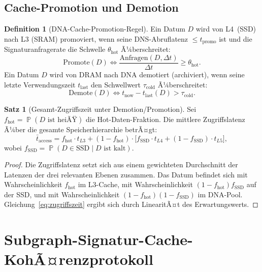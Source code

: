 ﻿\documentclass[a4paper,12pt]{article}
\theoremstyle{definition}
\newtheorem{definition}{Definition}[section]
\newtheorem{satz}{Satz}[section]
\DeclareMathOperator{\Prob}{\mathbb{P}}
\begin{document}
\subsection{Cache-Promotion und Demotion}

\begin{definition}[DNA-Cache-Promotion-Regel]
  \label{def:promotion}
  Ein Datum $D$ wird von L4~(SSD) nach L3 (SRAM) promoviert, wenn
  seine DNS-Abruflatenz $\le t_{\mathrm{promo}}$ ist und die
  Signaturanfragerate die Schwelle $\theta_{\mathrm{hot}}$ Ã¼berschreitet:
  \[
    \mathrm{Promote}(D) \iff
    \frac{\mathrm{Anfragen}(D, \Delta t)}{\Delta t} \ge \theta_{\mathrm{hot}}.
  \]
  Ein Datum $D$ wird von DRAM nach DNA demotiert (archiviert), wenn
  seine letzte Verwendungszeit $t_{\mathrm{last}}$ den Schwellwert
  $\tau_{\mathrm{cold}}$ Ã¼berschreitet:
  \[
    \mathrm{Demote}(D) \iff t_{\mathrm{now}} - t_{\mathrm{last}}(D) > \tau_{\mathrm{cold}}.
  \]
\end{definition}

\begin{satz}[Gesamt-Zugriffszeit unter Demotion/Promotion]
  \label{satz:zugriffszeit}
  Sei $f_{\mathrm{hot}} = \Prob(D \text{ ist heiÃŸ})$ die
  Hot-Daten-Fraktion. Die mittlere Zugriffslatenz Ã¼ber die gesamte
  Speicherhierarchie betrÃ¤gt:
  \begin{equation}
    \bar{t}_{\mathrm{access}} = f_{\mathrm{hot}} \cdot t_{L3}
    + (1 - f_{\mathrm{hot}}) \cdot \bigl[f_{\mathrm{SSD}} \cdot t_{L4}
    + (1 - f_{\mathrm{SSD}}) \cdot t_{L5}\bigr],
    \label{eq:zugriffszeit}
  \end{equation}
  wobei $f_{\mathrm{SSD}} = \Prob(D \in \mathrm{SSD} \mid D \text{ ist kalt})$.
\end{satz}

\begin{proof}
  Die Zugriffslatenz setzt sich aus einem gewichteten Durchschnitt der
  Latenzen der drei relevanten Ebenen zusammen. Das Datum befindet sich
  mit Wahrscheinlichkeit $f_{\mathrm{hot}}$ im L3-Cache,
  mit Wahrscheinlichkeit $(1-f_{\mathrm{hot}}) f_{\mathrm{SSD}}$ auf der SSD,
  und mit Wahrscheinlichkeit $(1-f_{\mathrm{hot}})(1-f_{\mathrm{SSD}})$ im DNA-Pool.
  Gleichung~\eqref{eq:zugriffszeit} ergibt sich durch LinearitÃ¤t des Erwartungswerts.
\end{proof}

\section{Subgraph-Signatur-Cache-KohÃ¤renzprotokoll}
\end{document}
